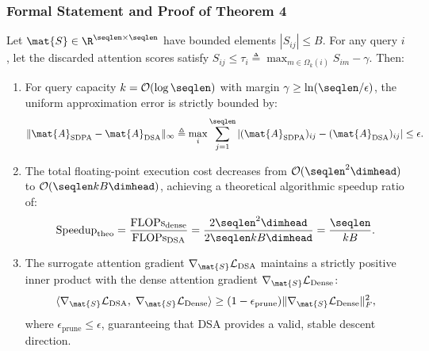 \subsubsection{Formal Statement and Proof of Theorem 4}

\begin{theorem}
\label{thm:dsa_bound}
Let $\mat{S} \in \R^{\seqlen \times \seqlen}$ have bounded elements $|S_{ij}| \le B$. For any query $i$, let the discarded attention scores satisfy $S_{ij} \le \tau_i \triangleq \max_{m \in \Omega_k(i)} S_{im} - \gamma$. Then:
\begin{enumerate}
    \item For query capacity $k = \mathcal{O}(\log \seqlen)$ with margin $\gamma \ge \ln(\seqlen / \epsilon)$, the uniform approximation error is strictly bounded by:
    \begin{equation}
    \| \mat{A}_{\text{SDPA}} - \mat{A}_{\text{DSA}} \|_\infty \triangleq \max_{i} \sum_{j=1}^{\seqlen} \left| (\mat{A}_{\text{SDPA}})_{ij} - (\mat{A}_{\text{DSA}})_{ij} \right| \le \epsilon.
    \label{eq:dsa_linfty_bound}
    \end{equation}
    \item The total floating-point execution cost decreases from $\mathcal{O}(\seqlen^2 \dimhead)$ to $\mathcal{O}(\seqlen k B \dimhead)$, achieving a theoretical algorithmic speedup ratio of:
    \begin{equation}
    \text{Speedup}_{\text{theo}} = \frac{\text{FLOPs}_{\text{dense}}}{\text{FLOPs}_{\text{DSA}}} = \frac{2 \seqlen^2 \dimhead}{2 \seqlen k B \dimhead} = \frac{\seqlen}{k B}.
    \label{eq:dsa_speedup_ratio}
    \end{equation}
    \item The surrogate attention gradient $\nabla_{\mat{S}} \mathcal{L}_{\text{DSA}}$ maintains a strictly positive inner product with the dense attention gradient $\nabla_{\mat{S}} \mathcal{L}_{\text{Dense}}$:
    \begin{equation}
    \langle \nabla_{\mat{S}} \mathcal{L}_{\text{DSA}}, \; \nabla_{\mat{S}} \mathcal{L}_{\text{Dense}} \rangle \ge (1 - \epsilon_{\text{prune}}) \| \nabla_{\mat{S}} \mathcal{L}_{\text{Dense}} \|_F^2,
    \label{eq:thm4_gradient_alignment}
    \end{equation}
    where $\epsilon_{\text{prune}} \le \epsilon$, guaranteeing that DSA provides a valid, stable descent direction.
\end{enumerate}
\end{theorem}

